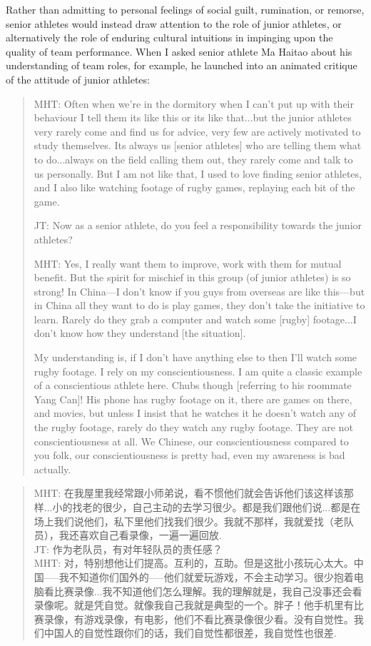 \begin{CJK}{UTF8}{gbsn}
Rather than admitting to personal feelings of social guilt, rumination, or remorse, senior athletes would instead draw attention to the role of junior athletes, or alternatively the role of enduring cultural intuitions in impinging upon the quality of team performance.  When I asked senior athlete Ma Haitao about his understanding of team roles, for example, he launched into an animated critique of the attitude of junior athletes:

  \begin{quote}
    MHT: Often when we're in the dormitory when I can't put up with their behaviour I tell them its like this or its like that...but the junior athletes very rarely come and find us for advice, very few are actively motivated to study themselves. Its always us [senior athletes] who are telling them what to do...always on the field calling them out, they rarely come and talk to us personally.  But I am not like that, I used to love finding senior athletes, and I also like watching footage of rugby games, replaying each bit of the game.

    JT: Now as a senior athlete, do you feel a responsibility towards the junior athletes?

    MHT: Yes, I really want them to improve, work with them for mutual benefit.  But the spirit for mischief in this group (of junior athletes) is so strong! In China---I don't know if you guys from overseas are like this---but in China all they want to do is play games, they don't take the initiative to learn.  Rarely do they grab a computer and watch some [rugby] footage...I don't know how they understand [the situation].

    My understanding is, if I don't have anything else to then I'll watch some rugby footage. I rely on my conscientiousness.  I am quite a classic example of a conscientious athlete here.  Chubs though [referring to his roommate Yang Can]!  His phone has rugby footage on it, there are games on there, and movies, but unless I insist that he watches it he doesn't watch any of the rugby footage, rarely do they watch any rugby footage.  They are not conscientiousness at all. We Chinese, our conscientiousness compared to you folk, our conscientiousness is pretty bad, even my awareness is bad actually.
  \end{quote}

  \begin{quote}
    MHT: 在我屋里我经常跟小师弟说，看不惯他们就会告诉他们该这样该那样...小的找老的很少，自己主动的去学习很少。都是我们跟他们说...都是在场上我们说他们，私下里他们找我们很少。我就不那样，我就爱找（老队员），我还喜欢自己看录像，一遍一遍回放. \\
    JT: 作为老队员，有对年轻队员的责任感？
    \\
    MHT: 对，特别想他让们提高。互利的，互助。但是这批小孩玩心太大。中国—--我不知道你们国外的—--他们就爱玩游戏，不会主动学习。很少抱着电脑看比赛录像...我不知道他们怎么理解。我的理解就是，我自己没事还会看录像呢。就是凭自觉。就像我自己我就是典型的一个。胖子！他手机里有比赛录像，有游戏录像，有电影，他们不看比赛录像很少看。没有自觉性。我们中国人的自觉性跟你们的话，我们自觉性都很差，我自觉性也很差.
  \end{quote}


\end{CJK}
